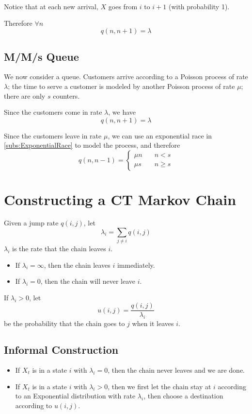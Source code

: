        Notice that at each new arrival, $X$ goes from $i$ to $i+1$ (with probability 1).
        
        Therefore $\forall n$
        \[ q(n, n+1) = \lambda \]

    \subsection{M/M/s Queue}
        We now consider a queue. Customers arrive according to a Poisson process of rate $\lambda$; the time to serve a customer is modeled by another Poisson process of rate $\mu$; there are only $s$ counters.

        Since the customers come in rate $\lambda$, we have
        \[ q(n, n+1) = \lambda \]

        Since the customers leave in rate $\mu$, we can use an exponential race in \ref{subs:ExponentialRace} to model the process, and therefore
        \[ q(n, n-1) = \begin{cases}
            \mu n & \quad n < s\\
            \mu s & \quad n \ge s
        \end{cases} \]


\section{Constructing a CT Markov Chain}
    Given a jump rate $q(i,j)$, let
    \[ \lambda_i = \sum_{j \neq i}q(i,j) \]
    $\lambda_i$ is the rate that the chain leaves $i$.
    \begin{itemize}
        \item If $\lambda_i = \infty$, then the chain leaves $i$ immediately.
        \item If $\lambda_i = 0$, then the chain will never leave $i$.
    \end{itemize}
    If $\lambda_i > 0$, let
    \[ u(i,j) = \frac{q(i,j)}{\lambda_i} \]
    be the probability that the chain goes to $j$ when it leaves $i$.

    \subsection{Informal Construction}
        \begin{itemize}
            \item If $X_t$ is in a state $i$ with $\lambda_i=0$, then the chain never leaves and we are done.
            \item If $X_t$ is in a state $i$ with $\lambda_i > 0$, then we first let the chain stay at $i$ according to an Exponential distribution with rate $\lambda_i$, then choose a destination according to $u(i,j)$.
        \end{itemize}



